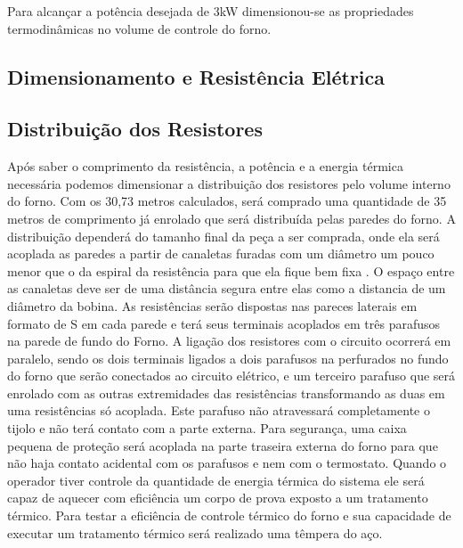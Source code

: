 Para alcançar a potência desejada de 3kW dimensionou-se as propriedades termodinâmicas no volume de controle do forno.

\subsection{Dimensionamento e Resistência Elétrica}

\subsection{Distribuição dos Resistores}

Após saber o comprimento da resistência, a potência e a energia térmica necessária podemos dimensionar a distribuição dos resistores pelo volume interno do forno. Com os 30,73 metros calculados, será comprado uma quantidade de 35 metros de comprimento já enrolado que será distribuída pelas paredes do forno. 
A distribuição dependerá do tamanho final da peça a ser comprada, onde ela será acoplada as paredes a partir de canaletas furadas com um diâmetro um pouco menor que o da espiral da resistência para que ela fique bem fixa . O espaço entre as canaletas deve ser de uma distância segura entre elas como a distancia de um diâmetro da bobina. As resistências serão dispostas nas pareces laterais em formato de S em cada parede e terá seus terminais acoplados em três parafusos na parede de fundo do Forno. A ligação dos resistores com o circuito ocorrerá em paralelo, sendo os dois terminais ligados a dois parafusos na perfurados no fundo do forno que serão conectados ao circuito elétrico, e um terceiro parafuso que será enrolado com as outras extremidades das resistências transformando as duas em uma resistências só acoplada. Este parafuso não atravessará completamente o tijolo e não terá contato com a parte externa. Para segurança, uma caixa pequena de proteção será acoplada na parte traseira externa do forno para que não haja contato acidental com os parafusos e nem com o termostato.
Quando o operador tiver controle da quantidade de energia térmica do sistema ele será capaz de aquecer com eficiência um corpo de prova exposto a um tratamento térmico. Para testar a eficiência de controle térmico do forno e sua capacidade de executar um tratamento térmico será realizado uma têmpera do aço.
